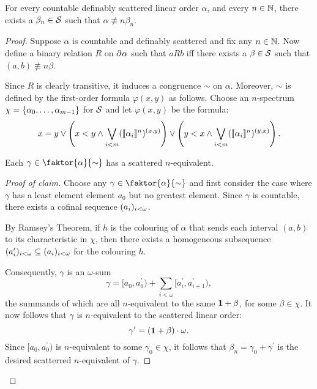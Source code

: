 \begin{thm}
	\label{thm:nscat}
	For every countable definably scattered linear order $\alpha$, and every
	$n\in\mathbb{N}$, there exists a $\beta_n\in\mathcal{S}$ such that
	$\alpha\nequiv{n}\beta_n$.
\end{thm}
\begin{proof}
	Suppose $\alpha$ is countable and definably scattered and fix any
	$n\in\mathbb{N}$.  Now define a binary relation $R$ on $\partial^{}{\alpha}$ such
	that $aRb$ iff there exists a $\beta\in\mathcal{S}$ such that
	$(a,b)\nequiv{n}\beta$.

	Since $R$ is clearly transitive, it induces a congruence $\sim$ on $\alpha$.
	Moreover, $\sim$ is defined by the first-order formula $\varphi(x,y)$ as
	follows.  Choose an $n$-spectrum $\chi=\left\lbrace \alpha_0,\dotsc,\alpha_{m-1}\right\rbrace$
	for $\mathcal{S}$ and let $\varphi(x,y)$ be the formula:
	\begin{equation}
		x=y\vee\left(x<y\wedge\bigvee_{i<m}(\llbracket\alpha_i\rrbracket^{n})^{(x,y)}\right)
		\vee\left(y<x\wedge\bigvee_{i<m}(\llbracket\alpha_i\rrbracket^{n})^{(y,x)} \right).
	\end{equation}

	\begin{claim}\label{clm:LL1}
		Each $\gamma\in\faktor{\alpha}{\sim}$ has a scattered $n$-equivalent.
	\end{claim}
	\begin{proof}[Proof of claim]
		Choose any $\gamma\in\faktor{\alpha}{\sim}$ and first consider the case
		where $\gamma$ has a least element element $a_0$ but no greatest
		element.  Since $\gamma$ is countable, there exists a cofinal sequence
		$(a_i)_{i<\omega}$.

		By Ramsey's Theorem, if $h$ is the colouring of $\alpha$ that sends each
		interval $(a,b)$ to its characteristic in $\chi$, then there exists
		a homogeneous subsequence
		$(a^\prime_i)_{i<\omega}\subseteq(a_i)_{i<\omega}$ for the
		colouring $h$.

		Consequently, $\gamma$ is an $\omega$-sum
		\begin{equation}
			\gamma=[a_0,a^\prime_0)+\sum_{i<\omega}[a^\prime_i,a^\prime_{i+1}),
		\end{equation}
		the summands of which are all $n$-equivalent to the same $\mathbf{1}+\beta$,
		for some $\beta\in\chi$.  It now follows that $\gamma$ is $n$-equivalent
		to the scattered linear order:
		\begin{equation}
			\gamma^\prime=(\mathbf{1}+\beta)\cdot\omega.
		\end{equation}
		Since $[a_0,a^\prime_0)$ is $n$-equivalent to some $\gamma_0\in\chi$,
		it follows that $\beta_n=\gamma_0+\gamma^\prime$ is the desired
		scatterred $n$-equivalent of $\gamma$.


\end{proof}
\end{proof}
